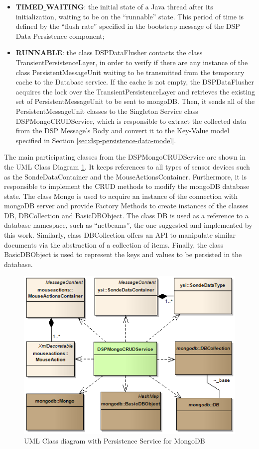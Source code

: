 \begin{itemize}
  \item \textbf{TIMED\underline{ }WAITING}: the initial state of a Java thread
  after its initialization, waiting to be on the ``runnable'' state. This
  period of time is defined by the ``flush rate''  specified in the bootstrap
  message of the DSP Data Persistence component;
  \item \textbf{RUNNABLE}: the class DSPDataFlusher contacts the class
  TransientPersistenceLayer, in order to verify if there are any instance of
  the class PersistentMessageUnit waiting to be transmitted from the temporary
  cache to the Database service. If the cache is not empty, the DSPDataFlusher 
  acquires the lock over the TransientPersistenceLayer and retrieves the
  existing set of PersistentMessageUnit to be sent to mongoDB. Then, it sends
  all of the PersistentMessageUnit classes to the Singleton Service class 
  DSPMongoCRUDService, which is responsible to extract the collected data from
  the DSP Message's Body and convert it to the Key-Value model specified in
  Section \ref{sec:dsp-persistence-data-model}.
\end{itemize}

The main participating classes from the DSPMongoCRUDService are shown in the
UML Class Diagram \ref{fig:DSP-Data-Persistence-Mongo-Classes}. It keeps references
to all types of sensor devices such as the SondeDataContainer and the
MouseActionsContainer. Furthermore, it is responsible to implement the CRUD
methods to modify the mongoDB database state. The class Mongo is used to acquire
an instance of the connection with mongoDB server and provide Factory Methods 
\cite{gof} to create instances of the classes DB, DBCollection and
BasicDBObject. The class DB is used as a reference to a database namespace, 
such as ``netbeams'', the one suggested and implemented by this work. Similarly,
class DBCollection offers an API to manipulate similar documents via the
abstraction of a collection of items. Finally, the class BasicDBObject is used
to represent the keys and values to be persisted in the database.

\begin{figure}[!h]
  \centering
  \includegraphics[scale=0.65]{../diagrams/DSP-Data-Persistence-Mongo-Classes}
  \caption{UML Class diagram with Persistence Service for MongoDB}
  \label{fig:DSP-Data-Persistence-Mongo-Classes}
\end{figure}


